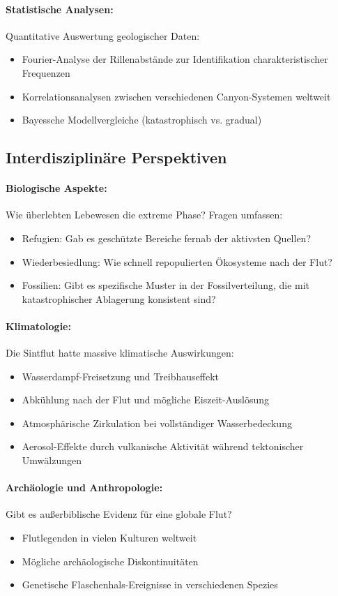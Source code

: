 ﻿\documentclass[12pt,a4paper]{report}
\begin{document}
\paragraph{Statistische Analysen:}
Quantitative Auswertung geologischer Daten:
\begin{itemize}
	\item Fourier-Analyse der Rillenabstände zur Identifikation charakteristischer Frequenzen
	\item Korrelationsanalysen zwischen verschiedenen Canyon-Systemen weltweit
	\item Bayessche Modellvergleiche (katastrophisch vs. gradual)
\end{itemize}

\subsection{Interdisziplinäre Perspektiven}

\paragraph{Biologische Aspekte:}
Wie überlebten Lebewesen die extreme Phase? Fragen umfassen:
\begin{itemize}
	\item Refugien: Gab es geschützte Bereiche fernab der aktivsten Quellen?
	\item Wiederbesiedlung: Wie schnell repopulierten Ökosysteme nach der Flut?
	\item Fossilien: Gibt es spezifische Muster in der Fossilverteilung, die mit katastrophischer Ablagerung konsistent sind?
\end{itemize}

\paragraph{Klimatologie:}
Die Sintflut hatte massive klimatische Auswirkungen:
\begin{itemize}
	\item Wasserdampf-Freisetzung und Treibhauseffekt
	\item Abkühlung nach der Flut und mögliche Eiszeit-Auslösung
	\item Atmosphärische Zirkulation bei vollständiger Wasserbedeckung
	\item Aerosol-Effekte durch vulkanische Aktivität während tektonischer Umwälzungen
\end{itemize}

\paragraph{Archäologie und Anthropologie:}
Gibt es außerbiblische Evidenz für eine globale Flut?
\begin{itemize}
	\item Flutlegenden in vielen Kulturen weltweit
	\item Mögliche archäologische Diskontinuitäten
	\item Genetische Flaschenhals-Ereignisse in verschiedenen Spezies
\end{itemize}
\end{document}
